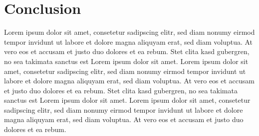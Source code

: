 \documentclass{vgtc} %
\begin{document}
\section{Conclusion}

Lorem ipsum dolor sit amet, consetetur sadipscing elitr, sed diam
nonumy eirmod tempor invidunt ut labore et dolore magna aliquyam erat,
sed diam voluptua. At vero eos et accusam et justo duo dolores et ea
rebum. Stet clita kasd gubergren, no sea takimata sanctus est Lorem
ipsum dolor sit amet. Lorem ipsum dolor sit amet, consetetur
sadipscing elitr, sed diam nonumy eirmod tempor invidunt ut labore et
dolore magna aliquyam erat, sed diam voluptua. At vero eos et accusam
et justo duo dolores et ea rebum. Stet clita kasd gubergren, no sea
takimata sanctus est Lorem ipsum dolor sit amet. Lorem ipsum dolor sit
amet, consetetur sadipscing elitr, sed diam nonumy eirmod tempor
invidunt ut labore et dolore magna aliquyam erat, sed diam
voluptua. At vero eos et accusam et justo duo dolores et ea
rebum.

%

%
%
%


\end{document}
